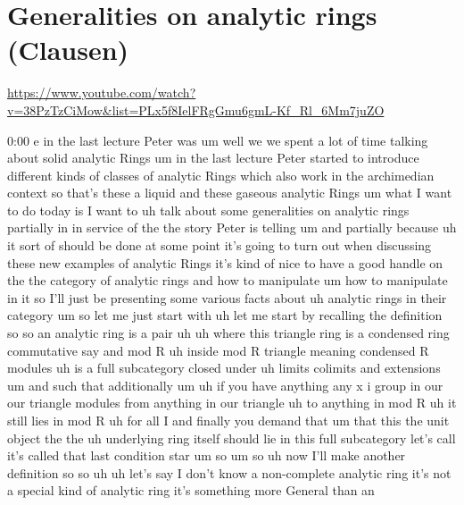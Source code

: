 
\section{\ufs Generalities on analytic rings (Clausen)}

\url{https://www.youtube.com/watch?v=38PzTzCiMow&list=PLx5f8IelFRgGmu6gmL-Kf_Rl_6Mm7juZO}
\renewcommand{\yt}[2]{\href{https://www.youtube.com/watch?v=38PzTzCiMow&list=PLx5f8IelFRgGmu6gmL-Kf_Rl_6Mm7juZO&t=#1}{#2}}
\vspace{1em}

\begin{unfinished}{0:00}
e
in  the  last  lecture  Peter  was  um  well  we
we  spent  a  lot  of  time  talking  about
solid  analytic  Rings  um  in  the  last
lecture  Peter  started  to  introduce
different  kinds  of  classes  of  analytic
Rings  which  also  work  in  the  archimedian
context  so  that's  these  a  liquid  and
these  gaseous  analytic  Rings
um  what  I  want  to  do  today  is  I  want  to
uh  talk  about  some  generalities  on
analytic
rings
partially  in  in  service  of  the  the  story
Peter  is  telling  um  and  partially
because  uh  it  sort  of  should  be  done  at
some  point  it's  going  to  turn  out  when
discussing  these  new  examples  of
analytic  Rings  it's  kind  of  nice  to  have
a  good  handle  on  the  the  category  of
analytic  rings  and  how  to
manipulate  um  how  to  manipulate  in  it  so
I'll  just  be  presenting  some  various
facts  about  uh  analytic  rings  in  their
category  um  so  let  me  just  start  with
uh  let  me  start  by  recalling  the
definition
so  so  an  analytic
ring  is  a
pair
uh  uh  where  this  triangle  ring  is  a
condensed  ring  commutative  say
and  mod
R  uh  inside  mod  R  triangle  meaning
condensed  R  modules  uh  is  a  full
subcategory  closed
under  uh  limits  colimits  and
extensions  um  and  such  that  additionally
um
uh  if  you  have  anything  any  x  i  group  in
our  our  triangle  modules  from  anything
in  our
triangle  uh  to  anything  in  mod  R  uh  it
still  lies  in  mod
R  uh  for  all
I  and  finally  you  demand  that  um  that
this  the  unit  object  the  the  uh
underlying  ring  itself  should  lie  in
this  full
subcategory  let's  call  it's  called  that
last  condition
star
um
so
um  so  uh  now  I'll  make  another
definition
so  so  uh  uh  let's  say  I  don't  know  a
non-complete  analytic
ring  it's  not  a  special  kind  of  analytic
ring  it's  something  more  General  than  an

\end{unfinished}
